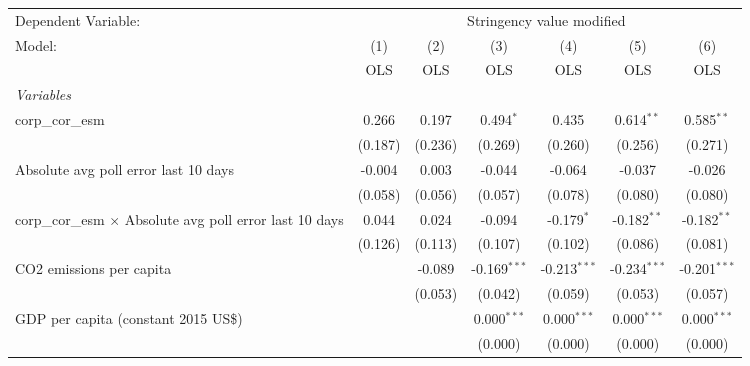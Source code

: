 
\begingroup
\centering
\begin{tabular}{lcccccc}
   \toprule
   Dependent Variable: & \multicolumn{6}{c}{Stringency value modified}\\
   Model:                                                          & (1)     & (2)     & (3)            & (4)            & (5)            & (6)\\  
                                                                   &  OLS    & OLS     & OLS            & OLS            & OLS            & OLS\\  
   \midrule
   \emph{Variables}\\
   corp\_cor\_esm                                                  & 0.266   & 0.197   & 0.494$^{*}$    & 0.435          & 0.614$^{**}$   & 0.585$^{**}$\\   
                                                                   & (0.187) & (0.236) & (0.269)        & (0.260)        & (0.256)        & (0.271)\\   
   Absolute avg poll error last 10 days                            & -0.004  & 0.003   & -0.044         & -0.064         & -0.037         & -0.026\\   
                                                                   & (0.058) & (0.056) & (0.057)        & (0.078)        & (0.080)        & (0.080)\\   
   corp\_cor\_esm $\times$ Absolute avg poll error last 10 days    & 0.044   & 0.024   & -0.094         & -0.179$^{*}$   & -0.182$^{**}$  & -0.182$^{**}$\\   
                                                                   & (0.126) & (0.113) & (0.107)        & (0.102)        & (0.086)        & (0.081)\\   
   CO2 emissions per capita                                        &         & -0.089  & -0.169$^{***}$ & -0.213$^{***}$ & -0.234$^{***}$ & -0.201$^{***}$\\   
                                                                   &         & (0.053) & (0.042)        & (0.059)        & (0.053)        & (0.057)\\   
   GDP per capita (constant 2015 US\$)                             &         &         & 0.000$^{***}$  & 0.000$^{***}$  & 0.000$^{***}$  & 0.000$^{***}$\\   
                                                                   &         &         & (0.000)        & (0.000)        & (0.000)        & (0.000)\\   

\end{tabular}
